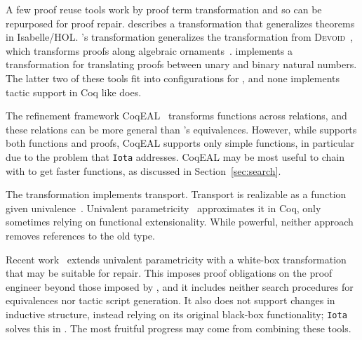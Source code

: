 A few proof reuse tools work by proof term transformation and so can be repurposed for proof repair.
\citet{Johnsen2004} describes a transformation that generalizes theorems in Isabelle/HOL.
\toolname's transformation generalizes the transformation from \textsc{Devoid}~\cite{Ringer2019},
which transforms proofs along algebraic ornaments~\cite{mcbride}.
\citet{magaud2000changing} implements a transformation for translating proofs between
unary and binary natural numbers. 
The latter two of these tools fit into configurations for \toolname,
and none implements tactic support in Coq like \toolname does.

The refinement framework CoqEAL~\cite{cohen:hal-01113453} transforms functions across relations,
and these relations can be more general than \toolname's equivalences.
However, while \toolname supports both functions and proofs, CoqEAL supports only simple functions,
in particular due to the problem that \lstinline{Iota} addresses.
CoqEAL may be most useful to chain with \toolname to get faster functions,
as discussed in Section~\ref{sec:search}.

The \toolname transformation implements transport.
Transport is realizable as a function given univalence~\cite{univalent2013homotopy}.
Univalent parametricity~\cite{tabareau2017equivalences} approximates it
in Coq, only sometimes relying on functional extensionality.
While powerful, neither approach removes references to the old type. %

Recent work~\cite{tabareau2019marriage} extends univalent parametricity with 
a white-box transformation that may be suitable for repair.
This imposes proof obligations on the proof engineer beyond those imposed by \toolname,
and it includes neither search procedures for equivalences nor tactic script generation.
It also does not support changes in inductive structure,
instead relying on its original black-box functionality;
\lstinline{Iota} solves this in \toolname. %
The most fruitful progress may come from combining these tools. %


